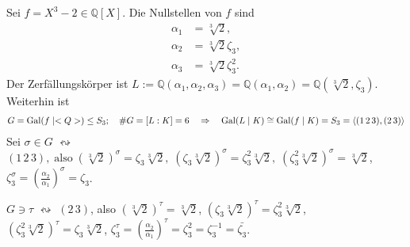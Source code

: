 \begin{example}
	Sei $f=X^3-2\in\mathbb Q[X]$. Die Nullstellen von $f$ sind \begin{align*}
		\alpha_1 &= \sqrt[3]{2},\\
		\alpha_2 &= \sqrt[3]{2}\zeta_3,\\
		\alpha_3 &= \sqrt[3]{2}\zeta_3^2.
	\end{align*}
	Der Zerfällungskörper ist $L:= \mathbb Q(\alpha_1,\alpha_2,\alpha_3) = \mathbb Q(\alpha_1,\alpha_2) = \mathbb Q(\sqrt[3]{2},\zeta_3)$. Weiterhin ist \begin{align*}
		G = \operatorname{Gal}(f\mid <Q>) \le S_3;\quad\# G = [L:K] = 6\quad\Rightarrow\quad \operatorname{Gal}(L\mid K)\cong \operatorname{Gal}(f\mid K) = S_3 = \langle (1\,2\,3),(2\,3)\rangle
	\end{align*}
	Sei $\sigma\in G$ $\leftrightsquigarrow$ $(1\,2\,3),\;\text{also}\; (\sqrt[3]2)^\sigma = \zeta_3\sqrt[3]2,\; (\zeta_3\sqrt[3]2)^\sigma = \zeta_3^2\sqrt[3]2,\;(\zeta_3^2\sqrt[3]2)^\sigma = \sqrt[3]2$, $\zeta_3^\sigma = (\frac{\alpha_2}{\alpha_1})^\sigma = \zeta_3$.
	
	$G \ni \tau$ $\leftrightsquigarrow$ $(2\,3)$, also $(\sqrt[3]2)^\tau = \sqrt[3]2$, $(\zeta_3\sqrt[3]2)^\tau = \zeta_3^2\sqrt[3]2$, $(\zeta_3^2\sqrt[3]2)^\tau = \zeta_3 \sqrt[3]2$, $\zeta_3^\tau = (\frac{\alpha_2}{\alpha_1})^\tau = \zeta_3^2 = \zeta_3^{-1} = \bar{\zeta_3}$.
	

\end{example}
